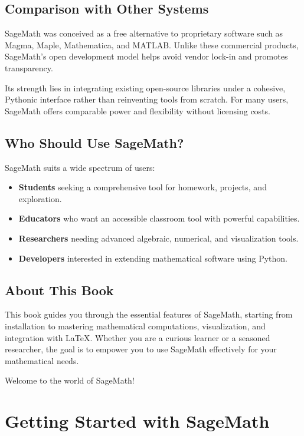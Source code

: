 \documentclass[12pt]{book}
\begin{document}
\section*{Comparison with Other Systems}

SageMath was conceived as a free alternative to proprietary software such as Magma, Maple, Mathematica, and MATLAB. Unlike these commercial products, SageMath's open development model helps avoid vendor lock-in and promotes transparency.

Its strength lies in integrating existing open-source libraries under a cohesive, Pythonic interface rather than reinventing tools from scratch. For many users, SageMath offers comparable power and flexibility without licensing costs.

\section*{Who Should Use SageMath?}

SageMath suits a wide spectrum of users:

\begin{itemize}
  \item \textbf{Students} seeking a comprehensive tool for homework, projects, and exploration.
  \item \textbf{Educators} who want an accessible classroom tool with powerful capabilities.
  \item \textbf{Researchers} needing advanced algebraic, numerical, and visualization tools.
  \item \textbf{Developers} interested in extending mathematical software using Python.
\end{itemize}

\section*{About This Book}

This book guides you through the essential features of SageMath, starting from installation to mastering mathematical computations, visualization, and integration with \LaTeX. Whether you are a curious learner or a seasoned researcher, the goal is to empower you to use SageMath effectively for your mathematical needs.

\bigskip

Welcome to the world of SageMath!


\chapter{Getting Started with SageMath}
\end{document}

